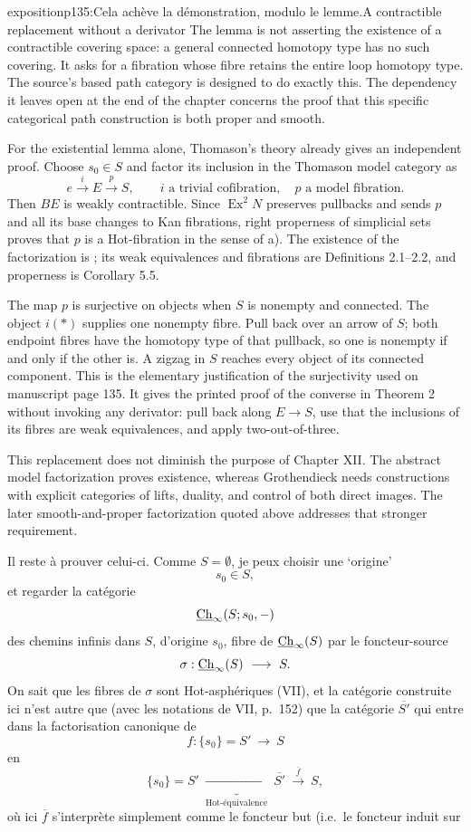 \begin{dcomment}{exposition}{p135:Cela achève la démonstration, modulo le lemme.}{A contractible replacement without a derivator}
The lemma is not asserting the existence of a contractible covering space: a general connected homotopy type has no such covering. It asks for a fibration whose fibre retains the entire loop homotopy type. The source's based path category is designed to do exactly this. The dependency it leaves open at the end of the chapter concerns the proof that this specific categorical path construction is both proper and smooth.

For the existential lemma alone, Thomason's theory already gives an independent proof. Choose \(s_0\in S\) and factor its inclusion in the Thomason model category as
\[
 e\xrightarrow{\ i\ }E\xrightarrow{\ p\ }S,
 \qquad i\text{ a trivial cofibration},\quad
 p\text{ a model fibration}.
\]
Then \(BE\) is weakly contractible. Since \(\operatorname{Ex}^2N\) preserves pullbacks and sends \(p\) and all its base changes to Kan fibrations, right properness of simplicial sets proves that \(p\) is a Hot-fibration in the sense of a). The existence of the factorization is \citet[Theorem 4.9]{Thomason1980}; its weak equivalences and fibrations are Definitions 2.1--2.2, and properness is Corollary 5.5.

The map \(p\) is surjective on objects when \(S\) is nonempty and connected. The object \(i(*)\) supplies one nonempty fibre. Pull back over an arrow of \(S\); both endpoint fibres have the homotopy type of that pullback, so one is nonempty if and only if the other is. A zigzag in \(S\) reaches every object of its connected component. This is the elementary justification of the surjectivity used on manuscript page 135. It gives the printed proof of the converse in Theorem 2 without invoking any derivator: pull back along \(E\longrightarrow S\), use that the inclusions of its fibres are weak equivalences, and apply two-out-of-three.

This replacement does not diminish the purpose of Chapter XII. The abstract model factorization proves existence, whereas Grothendieck needs constructions with explicit categories of lifts, duality, and control of both direct images. The later smooth-and-proper factorization quoted above addresses that stronger requirement.
\end{dcomment}


Il reste à prouver celui-ci. Comme $S = \emptyset$, je peux choisir une ‘origine’
\[
s_0 \in S,
\]
et regarder la catégorie
\[
\underline{\mathrm{Ch}}_{\infty}(S; s_0, -)
\]
des chemins infinis dans $S$, d'origine $s_0$, fibre de $\underline{\mathrm{Ch}}_{\infty}(S)$ par le foncteur-source
\[
\sigma : \Ch_{\infty}(S) \ \longrightarrow\ S.
\]
On sait que les fibres de $\sigma$ sont Hot-asphériques (VII), et la catégorie construite ici n'est autre que (avec les notations de VII, p.~152) que la catégorie $\overline{S'}$ qui entre dans la factorisation canonique de
\[
f : \{s_0\} = S' \ \longrightarrow\ S
\]
en
\[
\{s_0\} = S' \ \underbrace{\longrightarrow}_{\text{Hot-équivalence}}\ \overline{S'} \ \xrightarrow{\ \overline{f}\ }\ S,
\]
où ici $\overline{f}$ s'interprète simplement comme le foncteur but (i.e.\ le foncteur induit sur

